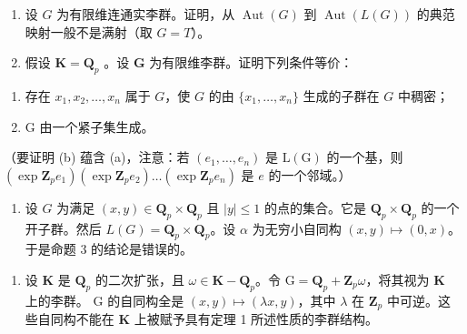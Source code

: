 
\begin{enumerate}
\def\labelenumi{\arabic{enumi}.}
\item
  设 \(G\) 为有限维连通实李群。证明，从 \(\operatorname{Aut}(G)\) 到 \(\operatorname{Aut}(L(G))\) 的典范映射一般不是满射（取 \(G = T\)）。
\item
  假设 \(\mathbf{K} = \mathbf{Q}_p\) 。设 \(\mathbf{G}\) 为有限维李群。证明下列条件等价：
\end{enumerate}

\begin{enumerate}
\def\labelenumi{(\alph{enumi})}
\item
  存在 \(x_{1}, x_{2}, \ldots, x_{n}\) 属于 \(G\)，使 \(G\) 的由 \(\{x_{1}, \ldots, x_{n}\}\) 生成的子群在 \(G\) 中稠密；
\item
  G 由一个紧子集生成。
\end{enumerate}

（要证明 (b) 蕴含 (a)，注意：若 \((e_1, \ldots, e_n)\) 是 \(\mathrm{L}(\mathrm{G})\) 的一个基，则 \((\exp \mathbf{Z}_p e_1)(\exp \mathbf{Z}_p e_2) \ldots (\exp \mathbf{Z}_p e_n)\) 是 \(e\) 的一个邻域。）

\begin{enumerate}
\def\labelenumi{\arabic{enumi}.}
\setcounter{enumi}{2}
\tightlist
\item
  设 \(G\) 为满足 \((x, y) \in \mathbf{Q}_p \times \mathbf{Q}_p\) 且 \(|y| \leqslant 1\) 的点的集合。它是 \(\mathbf{Q}_p \times \mathbf{Q}_p\) 的一个开子群。然后 \(L(G) = \mathbf{Q}_p \times \mathbf{Q}_p\)。设 \(\alpha\) 为无穷小自同构 \((x, y) \mapsto (0, x)\)。于是命题 3 的结论是错误的。
\end{enumerate}

\begin{enumerate}
\def\labelenumi{(\arabic{enumi})}
\setcounter{enumi}{3}
\tightlist
\item
  设 \(\mathbf{K}\) 是 \(\mathbf{Q}_p\) 的二次扩张，且 \(\omega \in \mathbf{K} - \mathbf{Q}_p\)。令 \(\mathrm{G} = \mathbf{Q}_p + \mathbf{Z}_p\omega\)，将其视为 \(\mathbf{K}\) 上的李群。 \(\mathrm{G}\) 的自同构全是 \((x,y)\mapsto (\lambda x,y)\)，其中 \(\lambda\) 在 \(\mathbf{Z}_p\) 中可逆。这些自同构不能在 \(\mathbf{K}\) 上被赋予具有定理 1 所述性质的李群结构。
\end{enumerate}

